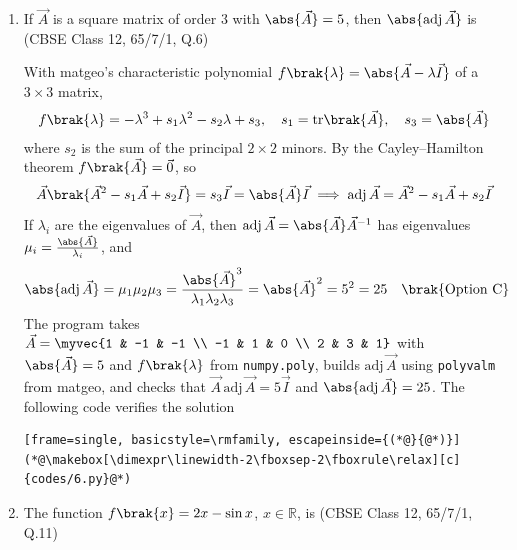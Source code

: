 \begin{enumerate}[label=\thesubsection.\arabic*, ref=\thesubsection.\theenumi]
\item
If $\vec{A}$ is a square matrix of order $3$ with $\abs{\vec{A}} = 5$, then $\abs{\text{adj}\,\vec{A}}$ is
\hfill (CBSE Class 12, 65/7/1, Q.6)

\solution
With matgeo's characteristic polynomial $f\brak{\lambda} = \abs{\vec{A} - \lambda\vec{I}}$ of a $3\times3$ matrix,
\begin{align}
	f\brak{\lambda} = -\lambda^3 + s_1\lambda^2 - s_2\lambda + s_3, \quad s_1 = \text{tr}\brak{\vec{A}}, \quad s_3 = \abs{\vec{A}}
\end{align}
where $s_2$ is the sum of the principal $2\times2$ minors. By the Cayley--Hamilton theorem $f\brak{\vec{A}} = \vec{0}$, so
\begin{align}
	\vec{A}\brak{\vec{A}^2 - s_1\vec{A} + s_2\vec{I}} = s_3\vec{I} = \abs{\vec{A}}\vec{I}
	\implies \text{adj}\,\vec{A} = \vec{A}^2 - s_1\vec{A} + s_2\vec{I}
\end{align}
If $\lambda_i$ are the eigenvalues of $\vec{A}$, then $\text{adj}\,\vec{A} = \abs{\vec{A}}\vec{A}^{-1}$ has eigenvalues $\mu_i = \frac{\abs{\vec{A}}}{\lambda_i}$, and
\begin{align}
	\abs{\text{adj}\,\vec{A}} = \mu_1\mu_2\mu_3 = \frac{\abs{\vec{A}}^3}{\lambda_1\lambda_2\lambda_3} = \abs{\vec{A}}^2 = 5^2 = 25 \quad \brak{\text{Option C}}
\end{align}
The program takes $\vec{A} = \myvec{1 & -1 & -1 \\ -1 & 1 & 0 \\ 2 & 3 & 1}$ with $\abs{\vec{A}} = 5$ and $f\brak{\lambda}$ from \texttt{numpy.poly}, builds $\text{adj}\,\vec{A}$ using \texttt{polyvalm} from matgeo, and checks that $\vec{A}\,\text{adj}\,\vec{A} = 5\vec{I}$ and $\abs{\text{adj}\,\vec{A}} = 25$. The following code verifies the solution
\begin{lstlisting}[frame=single, basicstyle=\rmfamily, escapeinside={(*@}{@*)}]
(*@\makebox[\dimexpr\linewidth-2\fboxsep-2\fboxrule\relax][c]{codes/6.py}@*)
\end{lstlisting}

\item
The function $f\brak{x} = 2x - \sin x$, $x \in \mathbb{R}$, is
\hfill (CBSE Class 12, 65/7/1, Q.11)


\end{enumerate}
